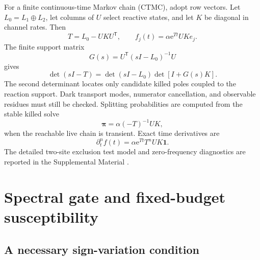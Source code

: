 \documentclass[aps,pre,reprint,amsmath,amssymb,longbibliography,floatfix]{revtex4-2}
\newcommand{\e}{\mathrm e}
\begin{document}
For a finite continuous-time Markov chain (CTMC), adopt row vectors. Let
\(L_0=L_1\oplus L_2\), let columns of \(U\) select reactive states, and let
\(K\) be diagonal in channel rates. Then
\begin{equation}
T=L_0-UKU^\mathsf T,\qquad
f_j(t)=\alpha\e^{Tt}UKe_j.
\label{eq:finite-channel}
\end{equation}
The finite support matrix
\[
G(s)=U^\mathsf T(sI-L_0)^{-1}U
\]
gives
\[
\det(sI-T)=\det(sI-L_0)\det[I+G(s)K].
\]
The second determinant locates only candidate killed poles coupled to the
reaction support. Dark transport modes, numerator cancellation, and
observable residues must still be checked. Splitting probabilities are
computed from the stable killed solve
\begin{equation}
\bm\pi=\alpha(-T)^{-1}UK,
\label{eq:splitting-killed}
\end{equation}
when the reachable live chain is transient. Exact time derivatives are
\begin{equation}
\partial_t^n f(t)=\alpha\e^{Tt}T^nUK\bm1.
\label{eq:time-derivatives}
\end{equation}
The detailed two-site exclusion test model and zero-frequency diagnostics are
reported in the Supplemental Material \cite{supplementalMaterial}.

\section{Spectral gate and fixed-budget susceptibility}
\label{sec:modality-design}

\subsection{A necessary sign-variation condition}
\label{sec:spectral-bound}
\end{document}
